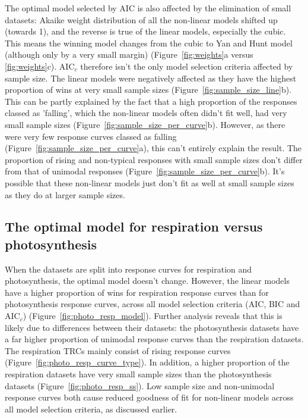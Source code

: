 \documentclass[11pt, a4paper]{article}
\begin{document}
The optimal model selected by AIC is also affected by the elimination of small datasets: Akaike weight distribution of all the non-linear models shifted up (towards 1), and the reverse is true of the linear models, especially the cubic. This means the winning model changes from the cubic to Yan and Hunt model (although only by a very small margin) (Figure~\ref{fig:weights}a versus \ref{fig:weights}c). AIC$_c$ therefore isn't the only model selection criteria affected by sample size. The linear models were negatively affected as they have the highest proportion of wins at very small sample sizes (Figure~\ref{fig:sample_size_line}b). This can be partly explained by the fact that a high proportion of the responses classed as 'falling', which the non-linear models often didn't fit well, had very small sample sizes (Figure~\ref{fig:sample_size_per_curve}b). However, as there were very few response curves classed as falling (Figure~\ref{fig:sample_size_per_curve}a), this can't entirely explain the result. The proportion of rising and non-typical responses with small sample sizes don't differ from that of unimodal responses (Figure~\ref{fig:sample_size_per_curve}b). It's possible that these non-linear models just don't fit as well at small sample sizes as they do at larger sample sizes.

\subsection{The optimal model for respiration versus photosynthesis}

When the datasets are split into response curves for respiration and photosynthesis, the optimal model doesn't change. However, the linear models have a higher proportion of wins for respiration response curves than for photosynthesis response curves, across all model selection criteria (AIC, BIC and AIC$_c$) (Figure~\ref{fig:photo_resp_model}). Further analysis reveals that this is likely due to differences between their datasets: the photosynthesis datasets have a far higher proportion of unimodal response curves than the respiration datasets. The respiration TRCs mainly consist of rising response curves (Figure~\ref{fig:photo_resp_curve_type}). In addition, a higher proportion of the respiration datasets have very small sample sizes than the photosynthesis datasets (Figure~\ref{fig:photo_resp_ss}). Low sample size and non-unimodal response curves both cause reduced goodness of fit for non-linear models across all model selection criteria, as discussed earlier.
\end{document}
